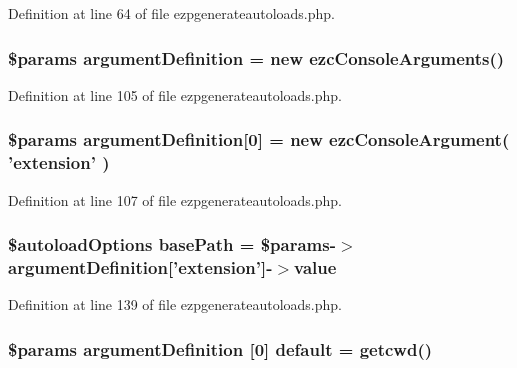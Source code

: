 Definition at line 64 of file ezpgenerateautoloads.\-php.

\hypertarget{ezpgenerateautoloads_8php_ab9a0a1710f335bc48a13e8a94802be23}{
\subsubsection[{argument\-Definition}]{\setlength{\rightskip}{0pt plus 5cm}\$params {\bf argument\-Definition} = new ezc\-Console\-Arguments()}}\label{ezpgenerateautoloads_8php_ab9a0a1710f335bc48a13e8a94802be23}


Definition at line 105 of file ezpgenerateautoloads.\-php.

\hypertarget{ezpgenerateautoloads_8php_aed0ba19f5204d9659e823271642a6594}{
\subsubsection[{argument\-Definition}]{\setlength{\rightskip}{0pt plus 5cm}\$params {\bf argument\-Definition}\mbox{[}0\mbox{]} = new ezc\-Console\-Argument( 'extension' )}}\label{ezpgenerateautoloads_8php_aed0ba19f5204d9659e823271642a6594}


Definition at line 107 of file ezpgenerateautoloads.\-php.

\hypertarget{ezpgenerateautoloads_8php_a29816a8455ff45c83cd2e389735c8207}{
\subsubsection[{base\-Path}]{\setlength{\rightskip}{0pt plus 5cm}\$autoload\-Options {\bf base\-Path} = \$params-\/$>${\bf argument\-Definition}\mbox{[}'extension'\mbox{]}-\/$>$value}}\label{ezpgenerateautoloads_8php_a29816a8455ff45c83cd2e389735c8207}


Definition at line 139 of file ezpgenerateautoloads.\-php.

\hypertarget{ezpgenerateautoloads_8php_a7cbde127000429b4c1ee76be227eca44}{
\subsubsection[{default}]{\setlength{\rightskip}{0pt plus 5cm}\$params {\bf argument\-Definition} \mbox{[}0\mbox{]} {\bf default} = getcwd()}}\label{ezpgenerateautoloads_8php_a7cbde127000429b4c1ee76be227eca44}


